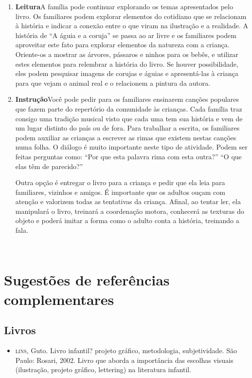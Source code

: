 \documentclass[11pt]{extarticle}
\begin{document}
\begin{enumerate}
\begin{enumerate}
\item \textbf{Leitura}\quad A família pode continuar 
explorando os temas apresentados pelo livro. Os familiares podem explorar 
elementos do cotidiano que se relacionam à história e indicar a conexão 
entre o que viram na ilustração e a realidade. A história de “A águia e a 
coruja” se passa ao ar livre e os familiares podem aproveitar este fato 
para explorar elementos da natureza com a criança. Oriente-os a mostrar as 
árvores, pássaros e ninhos para os bebês, e utilizar estes elementos para 
relembrar a história do livro. Se houver possibilidade, eles podem pesquisar 
imagens de corujas e águias e apresentá-las à criança para que vejam o animal 
real e o relacionem a pintura da autora. 

\item \textbf{Instrução}\quad Você pode pedir para os familiares ensinarem
canções populares que fazem parte do repertório da comunidade às crianças.
Cada família traz consigo uma tradição musical visto que cada uma tem 
sua história e vem de um lugar distinto do país ou de fora. 
Para trabalhar a escrita, os familiares podem auxiliar as crianças
a escrever as rimas que existem nestas canções numa folha.
O diálogo é muito importante neste tipo de atividade. Podem ser feitas perguntas
como: ``Por que esta palavra rima com esta outra?'' 
``O que elas têm de parecido?''

Outra opção é entregar o livro para a criança e pedir que ela 
leia para familiares, vizinhos e amigos. É importante que os adultos
ouçam com atenção e 
valorizem todas as tentativas da criança. Afinal, ao tentar ler, 
ela manipulará o livro, treinará a coordenação motora, conhecerá as texturas 
do objeto e poderá imitar a forma como o adulto 
conta a história, treinando a fala. 
\end{enumerate}

 
\section{Sugestões de referências complementares}

\subsection{Livros} 

\begin{itemize}
\item \textsc{lins}, Guto. Livro infantil? projeto gráfico, metodologia, subjetividade. São Paulo: Rosari, 2002.
Livro que aborda a importância das escolhas visuais (ilustração, projeto gráfico, lettering) na literatura infantil.  


\end{itemize}
\end{enumerate}
\end{document}

